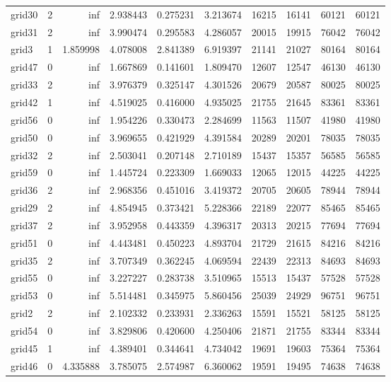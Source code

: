 \begin{longtable}{|l|r|r|r|r|r|r|r|r|r|}
grid30 & 2 & inf & 2.938443 & 0.275231 & 3.213674 & 16215 & 16141 & 60121 & 60121 \\
grid31 & 2 & inf & 3.990474 & 0.295583 & 4.286057 & 20015 & 19915 & 76042 & 76042 \\
grid3 & 1 & 1.859998 & 4.078008 & 2.841389 & 6.919397 & 21141 & 21027 & 80164 & 80164 \\
grid47 & 0 & inf & 1.667869 & 0.141601 & 1.809470 & 12607 & 12547 & 46130 & 46130 \\
grid33 & 2 & inf & 3.976379 & 0.325147 & 4.301526 & 20679 & 20587 & 80025 & 80025 \\
grid42 & 1 & inf & 4.519025 & 0.416000 & 4.935025 & 21755 & 21645 & 83361 & 83361 \\
grid56 & 0 & inf & 1.954226 & 0.330473 & 2.284699 & 11563 & 11507 & 41980 & 41980 \\
grid50 & 0 & inf & 3.969655 & 0.421929 & 4.391584 & 20289 & 20201 & 78035 & 78035 \\
grid32 & 2 & inf & 2.503041 & 0.207148 & 2.710189 & 15437 & 15357 & 56585 & 56585 \\
grid59 & 0 & inf & 1.445724 & 0.223309 & 1.669033 & 12065 & 12015 & 44225 & 44225 \\
grid36 & 2 & inf & 2.968356 & 0.451016 & 3.419372 & 20705 & 20605 & 78944 & 78944 \\
grid29 & 2 & inf & 4.854945 & 0.373421 & 5.228366 & 22189 & 22077 & 85465 & 85465 \\
grid37 & 2 & inf & 3.952958 & 0.443359 & 4.396317 & 20313 & 20215 & 77694 & 77694 \\
grid51 & 0 & inf & 4.443481 & 0.450223 & 4.893704 & 21729 & 21615 & 84216 & 84216 \\
grid35 & 2 & inf & 3.707349 & 0.362245 & 4.069594 & 22439 & 22313 & 84693 & 84693 \\
grid55 & 0 & inf & 3.227227 & 0.283738 & 3.510965 & 15513 & 15437 & 57528 & 57528 \\
grid53 & 0 & inf & 5.514481 & 0.345975 & 5.860456 & 25039 & 24929 & 96751 & 96751 \\
grid2 & 2 & inf & 2.102332 & 0.233931 & 2.336263 & 15591 & 15521 & 58125 & 58125 \\
grid54 & 0 & inf & 3.829806 & 0.420600 & 4.250406 & 21871 & 21755 & 83344 & 83344 \\
grid45 & 1 & inf & 4.389401 & 0.344641 & 4.734042 & 19691 & 19603 & 75364 & 75364 \\
grid46 & 0 & 4.335888 & 3.785075 & 2.574987 & 6.360062 & 19591 & 19495 & 74638 & 74638 \\

\end{longtable}
